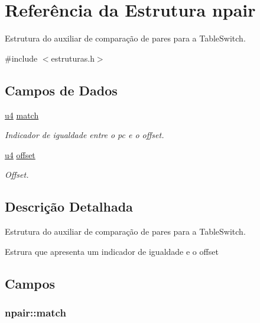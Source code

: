 \hypertarget{structnpair}{}\section{Referência da Estrutura npair}
\label{structnpair}


Estrutura do auxiliar de comparação de pares para a Table\+Switch.  




{\ttfamily \#include $<$estruturas.\+h$>$}

\subsection*{Campos de Dados}
\begin{DoxyCompactItemize}
\item 
\hyperlink{estruturas_8h_aedf6ddc03df8caaaccbb4c60b9a9b850}{u4} \hyperlink{structnpair_a638cc0bffebe3504c92ff603b2878625}{match}
\begin{DoxyCompactList}\small\item\em Indicador de igualdade entre o pc e o offset. \end{DoxyCompactList}\item 
\hyperlink{estruturas_8h_aedf6ddc03df8caaaccbb4c60b9a9b850}{u4} \hyperlink{structnpair_a333020fa37335ccefe10f2050b24ca6a}{offset}
\begin{DoxyCompactList}\small\item\em Offset. \end{DoxyCompactList}\end{DoxyCompactItemize}


\subsection{Descrição Detalhada}
Estrutura do auxiliar de comparação de pares para a Table\+Switch. 

Estrura que apresenta um indicador de igualdade e o offset 

\subsection{Campos}
\subsubsection[{\texorpdfstring{match}{match}}]{ npair\+::match}\hypertarget{structnpair_a638cc0bffebe3504c92ff603b2878625}{}\label{structnpair_a638cc0bffebe3504c92ff603b2878625}


